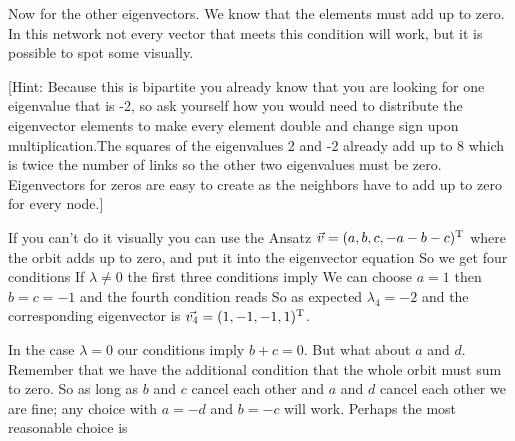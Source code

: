 Now for the other eigenvectors. We know that the elements must add up to zero. In this network not every vector that meets this condition will work, but it is possible to spot some visually. 

[Hint: Because this is bipartite you already know that you are looking for one eigenvalue that is -2, so ask yourself how you would need to distribute the eigenvector elements to make every element double and change sign upon multiplication.The squares of the eigenvalues 2 and -2 already add up to 8 which is twice the number of links so the other two eigenvalues must be zero. Eigenvectors for zeros are easy to create as the neighbors have to add up to zero for every node.]

If you can't do it visually you can use the Ansatz $\vec{v}=(a,b,c,-a-b-c)^{\rm T}$ where the orbit adds up to zero, and put it into the eigenvector equation
So we get four conditions 
If $\lambda \neq 0 $ the first three conditions imply  
We can choose $a=1$ then $b=c=-1$ and the fourth condition reads 
So as expected $\lambda_4=-2$ and the corresponding eigenvector is 
$\vec{v_4}=(1,-1,-1,1)^{\rm T}$.

In the case $\lambda=0$ our conditions imply $b+c=0$. But what about $a$ and $d$. Remember that we have the additional condition that the whole orbit must sum to zero. So as long as $b$ and $c$ cancel each other and $a$ and $d$ cancel each other we are fine; any choice with $a=-d$ and $b=-c$ will work. Perhaps the most reasonable choice is 

